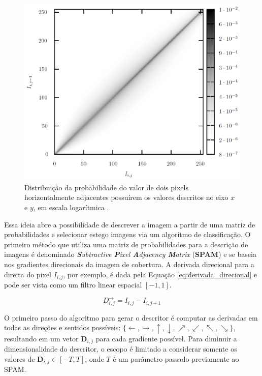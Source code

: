 \begin{figure}[!htb]
	\centering
	\includegraphics[width=.95\textwidth]{dados/figuras/SPAM1.png}
	\caption{Distribuição da probabilidade do valor de dois pixels horizontalmente adjacentes possuírem os valores descritos no eixo $x$ e $y$, em escala logarítmica \cite{spam}.}
    \label{fig:spam}
\end{figure}

Essa ideia abre a possibilidade de descrever a imagem a partir de uma matriz de probabilidades e selecionar estego imagens via um algoritmo de classificação. O primeiro método que utiliza uma matriz de probabilidades para a descrição de imagens é denominado \textit{\textbf{S}ubtractive \textbf{P}ixel \textbf{A}djacency \textbf{M}atrix} (\textbf{SPAM}) e se baseia nos gradientes direcionais da imagem de cobertura. A derivada direcional para a direita do pixel $I_{i,j}$, por exemplo, é dada pela Equação \ref{eq:derivada_direcional} e pode ser vista como um filtro linear espacial $[-1,1]$.

\begin{equation}
	\label{eq:derivada_direcional}
    D^{\rightarrow}_{i,j} = I_{i,j} - I_{i,j+1}
\end{equation}

O primeiro passo do algoritmo para gerar o descritor é computar as derivadas em todas as direções e sentidos possíveis: $\{\leftarrow, \rightarrow, \uparrow, \downarrow, \nearrow, \swarrow, \nwarrow, \searrow \}$, resultando em um vetor $\textbf{D}_{i,j}$ para cada gradiente possível. Para diminuir a dimensionalidade do descritor, o escopo é limitado a considerar somente os valores de $ \textbf{D}_{i,j} \in [-T, T]$, onde $T$ é um parâmetro passado previamente ao SPAM.


